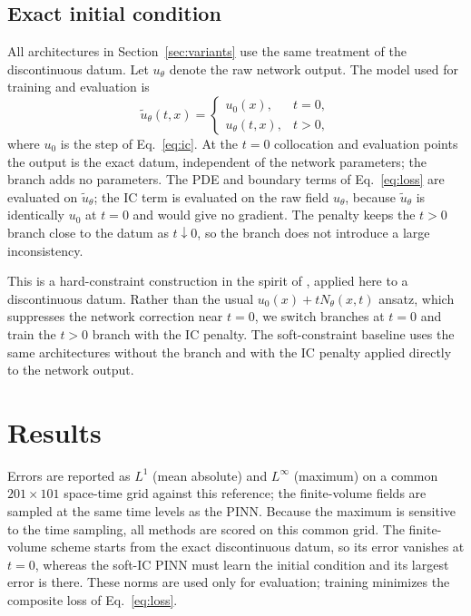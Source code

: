 \documentclass[11pt]{article}
\begin{document}
\subsection{Exact initial condition}
\label{sec:hardic}
All architectures in Section~\ref{sec:variants} use the same treatment of the
discontinuous datum. Let $u_\theta$ denote the raw network output. The model
used for training and evaluation is
\begin{equation}
  \tilde u_\theta(t,x) =
  \begin{cases}
    u_0(x), & t=0,\\
    u_\theta(t,x), & t>0,
  \end{cases}
  \label{eq:hardic}
\end{equation}
where $u_0$ is the step of Eq.~\eqref{eq:ic}. At the $t=0$ collocation and
evaluation points the output is the exact datum, independent of the network
parameters; the branch adds no parameters. The PDE and boundary terms of
Eq.~\eqref{eq:loss} are evaluated on $\tilde u_\theta$; the IC term is
evaluated on the raw field $u_\theta$, because $\tilde u_\theta$ is identically
$u_0$ at $t=0$ and would give no gradient. The penalty keeps the $t>0$ branch
close to the datum as $t\downarrow0$, so the branch does not introduce a large
inconsistency.

This is a hard-constraint construction in the spirit of
\citep{lagaris1998,lu2021hpinn,hao2024hardic}, applied here to a discontinuous
datum. Rather than the usual $u_0(x)+tN_\theta(x,t)$ ansatz, which suppresses
the network correction near $t=0$, we switch branches at $t=0$ and train the
$t>0$ branch with the IC penalty. The soft-constraint baseline uses the same
architectures without the branch and with the IC penalty applied directly to
the network output.

\section{Results}
\label{sec:results}

Errors are reported as $L^1$ (mean absolute) and $L^\infty$ (maximum) on a
common $201\times101$ space-time grid against this reference; the
finite-volume fields are sampled at the same time levels as the PINN. Because
the maximum is sensitive to the time sampling, all methods are scored on this
common grid. The finite-volume scheme starts from the exact discontinuous
datum, so its error vanishes at $t=0$, whereas the soft-IC PINN must learn the
initial condition and its largest error is there. These norms are used only
for evaluation; training minimizes the composite loss of Eq.~\eqref{eq:loss}.
\end{document}
